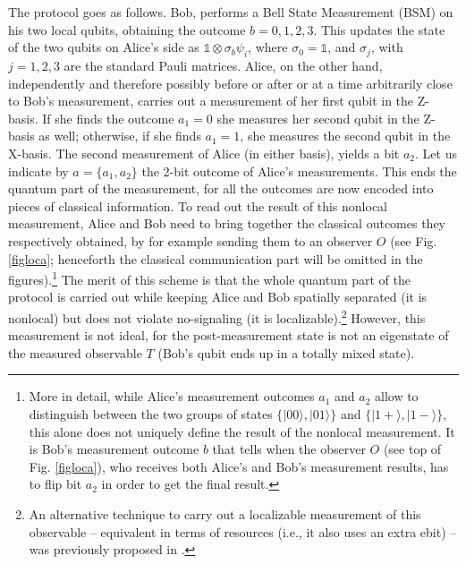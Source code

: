 \documentclass[12pt]{article}
\newcommand{\ket}[1]{| {#1} \rangle} %
\begin{document}
The protocol goes as follows. Bob, performs a Bell State Measurement (BSM)  on his two local qubits, obtaining the outcome $b=0,1,2,3$. This updates the state of the two qubits on Alice's side as $\mathds{1}\otimes\sigma_b\psi_i$, where $\sigma_0=\mathds 1$, and $\sigma_j$, with $j=1, 2, 3$ are the standard Pauli matrices. Alice, on the other hand, independently and therefore possibly before or after or at a time arbitrarily close to Bob's measurement, carries out a measurement of her first qubit in the  Z-basis. If she finds the outcome $a_1=0$ she measures her second qubit in the Z-basis as well; otherwise, if she finds $a_1=1$, she measures the second qubit in the X-basis. The second measurement of Alice (in either basis), yields a bit $a_2$. Let us indicate by $a=\{a_1,a_2\}$ the 2-bit outcome of Alice's measurements.
 This ends the quantum part of the measurement, for all the outcomes are now encoded into pieces of classical information. To read out the result of this nonlocal measurement, Alice and Bob need to bring together the classical outcomes they respectively obtained, by for example sending them to an observer $O$ (see Fig. \ref{figloca}; henceforth the classical communication part will be omitted in the figures).\footnote{More in detail, while Alice’s measurement outcomes $a_1$ and $a_2$ allow to distinguish between the two groups of states $\{\ket{00},\ket{01}\}$ and  $\{\ket{1+},\ket{1-}\}$, this alone does not uniquely define the result of the nonlocal measurement. It is Bob’s measurement outcome $b$ that tells when the observer $O$ (see top of Fig. \ref{figloca}), who receives both Alice’s and Bob’s measurement results, has to flip bit $a_2$ in order to get the final result.} The merit of this scheme is that the whole quantum part of the protocol is carried out while keeping Alice and Bob spatially separated (it is nonlocal) but does not violate no-signaling (it is localizable).\footnote{An alternative technique to carry out a localizable measurement of this observable -- equivalent in terms of resources (i.e., it also uses an extra ebit) -- was previously proposed in \cite{groisman2002measurements}.} However, this measurement is not ideal, for the post-measurement state is not an eigenstate of the measured observable $T$ (Bob's qubit ends up in a totally mixed state).
\end{document}
